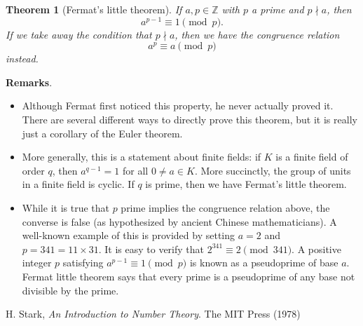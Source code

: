 \documentclass[12pt]{article}
\newtheorem*{thm*}{Theorem}
\begin{document}
\begin{thm*}[Fermat's little theorem] If $a, p \in \mathbb{Z}$ with $p$ a prime and $p \nmid a$, then $$a^{p-1} \equiv 1 \pmod{p}.$$ If we take away the condition that $p\nmid a$, then we have the congruence relation $$a^p\equiv a \pmod{p}$$ instead.  \end{thm*}

\textbf{Remarks}.  
\begin{itemize}
\item Although Fermat first noticed this property, he never actually proved it.  There are several different ways to directly prove this theorem, but it is really just a corollary of the Euler theorem.
\item More generally, this is a statement about finite fields: if $K$ is a finite field of order $q$, then $a^{q-1}=1$ for all $0\ne a\in K$.  More succinctly, the group of units in a finite field is cyclic.  If $q$ is prime, then we have Fermat's little theorem.
\item While it is true that $p$ prime implies the congruence relation above, the converse is false (as hypothesized by ancient Chinese mathematicians).  A well-known example of this is provided by setting $a=2$ and $p=341=11\times 31$.  It is easy to verify that $2^{341}\equiv 2 \pmod{341}$.  A positive integer $p$ satisfying $a^{p-1}\equiv 1 \pmod{p}$ is known as a pseudoprime of base $a$.  Fermat little theorem says that every prime is a pseudoprime of any base not divisible by the prime.
\end{itemize}

\begin{thebibliography}{7}
 H. Stark, {\em An Introduction to Number Theory}. The MIT Press (1978)
\end{thebibliography}
\end{document}
